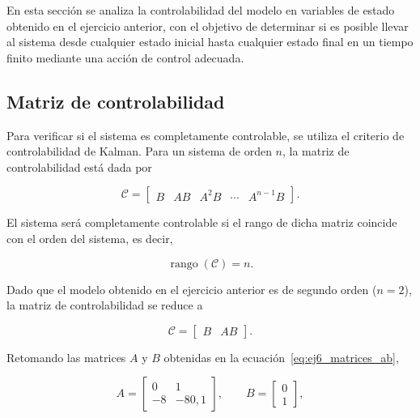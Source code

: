 \documentclass[10pt]{article}
\begin{document}
En esta sección se analiza la controlabilidad del modelo
en variables de estado obtenido en el ejercicio anterior,
con el objetivo de determinar si es posible llevar al
sistema desde cualquier estado inicial hasta cualquier
estado final en un tiempo finito mediante una acción de
control adecuada.


\subsection{Matriz de controlabilidad}

Para verificar si el sistema es completamente controlable,
se utiliza el criterio de controlabilidad de Kalman.
Para un sistema de orden $n$, la matriz de controlabilidad
está dada por

\begin{equation}
    \mathcal{C}=
    \begin{bmatrix}
        B & AB & A^2B & \cdots & A^{n-1}B
    \end{bmatrix}.
\end{equation}

El sistema será completamente controlable si el rango
de dicha matriz coincide con el orden del sistema, es decir,

\begin{equation}
    \operatorname{rango}(\mathcal{C})=n.
\end{equation}

Dado que el modelo obtenido en el ejercicio anterior
es de segundo orden ($n=2$), la matriz de controlabilidad
se reduce a

\begin{equation}
    \mathcal{C}=
    \begin{bmatrix}
        B & AB
    \end{bmatrix}.
\end{equation}

Retomando las matrices $A$ y $B$ obtenidas en la
ecuación~\eqref{eq:ej6_matrices_ab},

\begin{equation}
    A=
    \begin{bmatrix}
        0 & 1\\
        -8 & -80{,}1
    \end{bmatrix},
    \qquad
    B=
    \begin{bmatrix}
        0\\
        1
    \end{bmatrix},
\end{equation}
\end{document}
